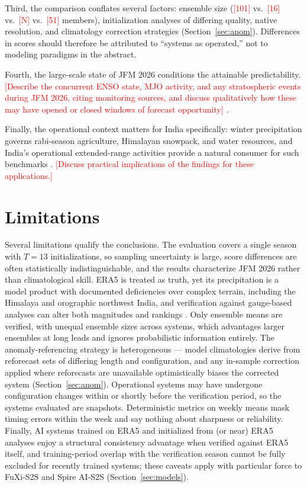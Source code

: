 \documentclass[11pt]{article}
\newcommand{\ph}[1]{\textcolor{red}{[#1]}}
\begin{document}
Third, the comparison conflates several factors: ensemble size
(\ph{101} vs.\ \ph{16} vs.\ \ph{N} vs.\ \ph{51} members),
initialization analyses of differing quality, native resolution, and
climatology correction strategies (Section~\ref{sec:anom}).
Differences in scores should therefore be attributed to ``systems as
operated,'' not to modeling paradigms in the abstract.

Fourth, the large-scale state of JFM 2026 conditions the attainable
predictability. \ph{Describe the concurrent ENSO state, MJO activity,
and any stratospheric events during JFM 2026, citing monitoring
sources, and discuss qualitatively how these may have opened or
closed windows of forecast opportunity}
\citep{mariotti2020,domeisen2022,wheelerhendon2004,zhang2005}.

Finally, the operational context matters for India specifically:
winter precipitation governs rabi-season agriculture, Himalayan
snowpack, and water resources, and India's operational extended-range
activities provide a natural consumer for such benchmarks
\citep{rao2019,pattanaik2019,dimri2015,hunt2018}. \ph{Discuss
practical implications of the findings for these applications.}

\section{Limitations}\label{sec:limitations}

Several limitations qualify the conclusions. The evaluation covers a
single season with $T=13$ initializations, so sampling uncertainty is
large, score differences are often statistically indistinguishable,
and the results characterize JFM 2026 rather than climatological
skill. ERA5 is treated as truth, yet its precipitation is a model
product with documented deficiencies over complex terrain, including
the Himalaya and orographic northwest India, and verification against
gauge-based analyses can alter both magnitudes and rankings
\citep{hersbach2020,pai2014}. Only ensemble means are verified, with
unequal ensemble sizes across systems, which advantages larger
ensembles at long leads and ignores probabilistic information
entirely. The anomaly-referencing strategy is heterogeneous --- model
climatologies derive from reforecast sets of differing length and
configuration, and any in-sample correction applied where reforecasts
are unavailable optimistically biases the corrected system
(Section~\ref{sec:anom}). Operational systems may have undergone
configuration changes within or shortly before the verification
period, so the systems evaluated are snapshots. Deterministic metrics
on weekly means mask timing errors within the week and say nothing
about sharpness or reliability. Finally, AI systems trained on ERA5
and initialized from (or near) ERA5 analyses enjoy a structural
consistency advantage when verified against ERA5 itself, and
training-period overlap with the verification season cannot be fully
excluded for recently trained systems; these caveats apply with
particular force to FuXi-S2S and Spire AI-S2S
(Section~\ref{sec:models}).
\end{document}
